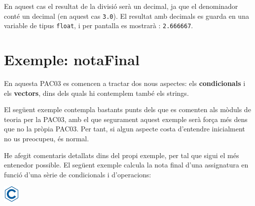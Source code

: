 \documentclass[]{book}
\begin{document}
En aquest cas el resultat de la divisió serà un decimal, ja que el
denominador conté un decimal (en aquest cas \texttt{3.0}). El resultat
amb decimals es guarda en una variable de tipus \texttt{float}, i per
pantalla es mostrarà : \texttt{2.666667}.

\section{Exemple: notaFinal}\label{exemple-notafinal}

En aquesta PAC03 es comencen a tractar dos nous aspectes: els
\textbf{condicionals} i els \textbf{vectors}, dins dels quals hi
contemplem també els strings.

El següent exemple contempla bastants punts dels que es comenten als
mòduls de teoria per la PAC03, amb el que segurament aquest exemple serà
força més dens que no la pròpia PAC03. Per tant, si algun aspecte costa
d'entendre inicialment no us preocupeu, és normal.

He afegit comentaris detallats dins del propi exemple, per tal que sigui
el més entenedor possible. El següent exemple calcula la nota final
d'una assignatura en funció d'una sèrie de condicionals i d'operacions:

\includegraphics{./img/c.png}
\end{document}
